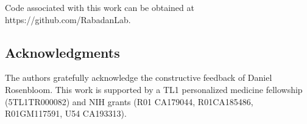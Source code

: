 \documentclass[a4paper,11pt]{article}
\begin{document}
\par

Code associated with this work can be obtained at https://github.com/RabadanLab.


\subsection*{Acknowledgments}

The authors gratefully acknowledge the constructive feedback of Daniel Rosenbloom.
This work is supported by a TL1 personalized medicine fellowship (5TL1TR000082) and NIH grants (R01 CA179044, R01CA185486, R01GM117591, U54 CA193313).




\end{document}
